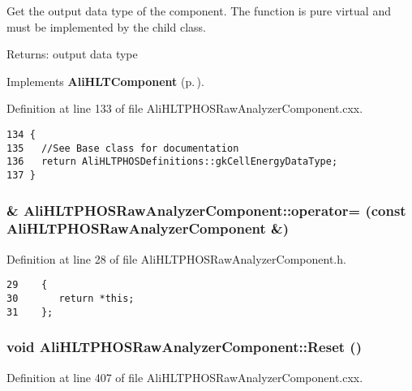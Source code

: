 Get the output data type of the component. The function is pure virtual and must be implemented by the child class. \begin{Desc}
\item[Returns:]output data type \end{Desc}


Implements {\bf Ali\-HLTComponent} {\rm (p.\,\pageref{classAliHLTComponent_a11})}.

Definition at line 133 of file Ali\-HLTPHOSRaw\-Analyzer\-Component.cxx.

\footnotesize\begin{verbatim}134 {
135   //See Base class for documentation 
136   return AliHLTPHOSDefinitions::gkCellEnergyDataType;
137 }
\end{verbatim}\normalsize 


\subsubsection{\& Ali\-HLTPHOSRaw\-Analyzer\-Component::operator= (const {\bf Ali\-HLTPHOSRaw\-Analyzer\-Component} \&)\hspace{0.3cm}{\tt  [inline]}}\label{classAliHLTPHOSRawAnalyzerComponent_a3}




Definition at line 28 of file Ali\-HLTPHOSRaw\-Analyzer\-Component.h.

\footnotesize\begin{verbatim}29    {
30       return *this;
31    };
\end{verbatim}\normalsize 


\subsubsection{\setlength{\rightskip}{0pt plus 5cm}void Ali\-HLTPHOSRaw\-Analyzer\-Component::Reset ()\hspace{0.3cm}{\tt  [private]}}\label{classAliHLTPHOSRawAnalyzerComponent_d1}




Definition at line 407 of file Ali\-HLTPHOSRaw\-Analyzer\-Component.cxx.


